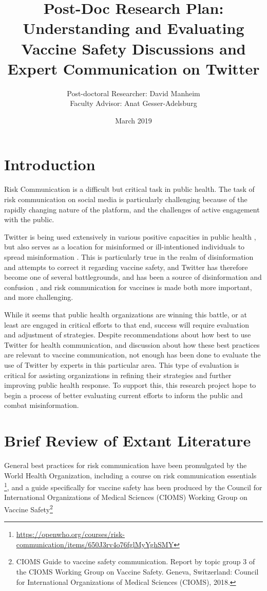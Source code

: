 \documentclass{article}
\title{Post-Doc Research Plan: \\\Large{Understanding and Evaluating Vaccine Safety Discussions and Expert Communication on Twitter}}
\author{Post-doctoral Researcher: David Manheim \\Faculty Advisor: Anat Gesser-Adelsburg}
\date{March 2019}
\begin{document}
\maketitle

\section{Introduction}
Risk Communication is a difficult but critical task in public health. The task of risk communication on social media is particularly challenging because of the rapidly changing nature of the platform, and the challenges of active engagement with the public. 

Twitter is being used extensively in various positive capacities in public health%
, but also serves as a location for misinformed or ill-intentioned individuals to spread misinformation%
. This is particularly true in the realm of disinformation and attempts to correct it regarding vaccine safety, and Twitter has therefore become one of several battlegrounds, and has been a source of disinformation and confusion%
, and risk communication for vaccines is made both more important, and more challenging.

While it seems that public health organizations are winning this battle, or at least are engaged in critical efforts to that end, success will require evaluation and adjustment of strategies. Despite recommendations about how best to use Twitter for health communication, and discussion about how these best practices are relevant to vaccine communication, not enough has been done to evaluate the use of Twitter by experts in this particular area. This type of evaluation is critical for assisting organizations in refining their strategies and further improving public health response. To support this, this research project hope to begin a process of better evaluating current efforts to inform the public and combat misinformation.

\section{Brief Review of Extant Literature}

General best practices for risk communication have been promulgated by the World Health Organization, including a course on risk communication essentials \footnote{\url{https://openwho.org/courses/risk-communication/items/650J3rv4o76fglMyYghSMY}}, and a guide specifically for vaccine safety has been produced by the Council for International Organizations of Medical Sciences (CIOMS) Working Group on Vaccine Safety\footnote{CIOMS Guide to vaccine safety communication. Report by topic group 3 of the CIOMS Working Group on Vaccine Safety. Geneva, Switzerland: Council for International Organizations of Medical Sciences (CIOMS), 2018.} 
\end{document}
